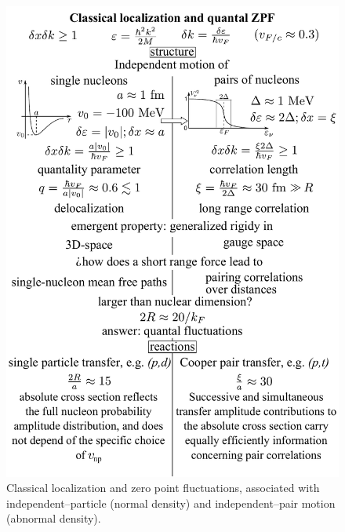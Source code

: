 \begin{figure}
\centerline{\includegraphics*[width=\textwidth,angle=0]{nutshell/figs/Resume.pdf}}
\caption{Classical localization and zero point fluctuations, associated with independent--particle (normal density) and independent--pair motion (abnormal density).}\label{fig1D2}
\end{figure}





